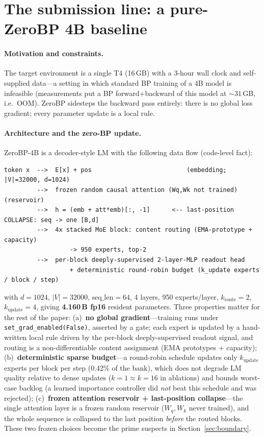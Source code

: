 \documentclass[11pt]{article}
\newcommand{\zbp}{ZeroBP-4B}
\begin{document}
\section{The submission line: a pure-ZeroBP 4B baseline}
\label{sec:submission}

\paragraph{Motivation and constraints.} The target environment is a single T4 (16\,GB) with a 3-hour wall
clock and self-supplied data---a setting in which standard BP training of a 4B model is infeasible
(measurements put a BP forward+backward of this model at ${\sim}31$\,GB, i.e.\ OOM). ZeroBP sidesteps the
backward pass entirely: there is no global loss gradient; every parameter update is a local rule.

\paragraph{Architecture and the zero-BP update.} \zbp{} is a decoder-style LM with the following data flow
(code-level fact):

{\small
\begin{verbatim}
token x  -->  E[x] + pos                          (embedding; |V|=32000, d=1024)
         -->  frozen random causal attention (Wq,Wk not trained)  (reservoir)
         -->  h = (emb + att*emb)[:, -1]      <-- last-position COLLAPSE: seq -> one [B,d]
         -->  4x stacked MoE block: content routing (EMA-prototype + capacity)
                  -> 950 experts, top-2
         -->  per-block deeply-supervised 2-layer-MLP readout head
                  + deterministic round-robin budget (k_update experts / block / step)
\end{verbatim}
}

\noindent with $d{=}1024$, $|V|{=}32000$, $\text{seq\_len}{=}64$, 4 layers, 950 experts/layer,
$k_{\text{route}}{=}2$, $k_{\text{update}}{=}4$, giving \textbf{4.160\,B fp16} resident parameters. Three
properties matter for the rest of the paper: (a)~\textbf{no global gradient}---training runs under
\texttt{set\_grad\_enabled(False)}, asserted by a gate; each expert is updated by a hand-written local rule
driven by the per-block deeply-supervised readout signal, and routing is a non-differentiable content
assignment (EMA prototypes + capacity); (b)~\textbf{deterministic sparse budget}---a round-robin schedule
updates only $k_{\text{update}}$ experts per block per step (0.42\% of the bank), which does not degrade LM
quality relative to dense updates ($k{=}1 \approx k{=}16$ in ablations) and bounds worst-case backlog (a
learned importance controller did \emph{not} beat this schedule and was rejected); (c)~\textbf{frozen
attention reservoir + last-position collapse}---the single attention layer is a frozen random reservoir
($W_q,W_k$ never trained), and the whole sequence is collapsed to the last position \emph{before} the routed
blocks. These two frozen choices become the prime suspects in Section~\ref{sec:boundary}.
\end{document}
